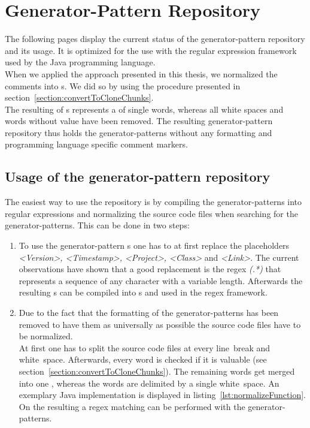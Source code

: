 
\chapter{Generator-Pattern Repository}\label{chapter:generatorPatternRepository}
The following pages display the current status of the generator-pattern repository and its usage. It is optimized for the use with the regular expression framework used by the Java programming language.\\
When we applied the approach presented in this thesis, we normalized the comments into s. We did so by using the procedure presented in section~\ref{section:convertToCloneChunks}.\\
The resulting  of s represents a  of single words, whereas all white spaces and words without value have been removed. The resulting generator-pattern repository thus holds the generator-patterns without any formatting and programming language specific comment markers.

\section{Usage of the generator-pattern repository}
The easiest way to use the repository is by compiling the generator-patterns into regular expressions and normalizing the source code files when searching for the generator-patterns. This can be done in two steps:

\begin{enumerate}
	\item To use the generator-pattern s one has to at first replace the placeholders \textit{<Version>, <Timestamp>, <Project>, <Class>} and \textit{<Link>}. The current observations have shown that a good replacement is the regex \textit{(.*)} that represents a sequence of any character with a variable length. Afterwards the resulting s can be compiled into s and used in the regex framework.
	\item Due to the fact that the formatting of the generator-patterns has been removed to have them as universally as possible the source code files have to be normalized. \\
	At first one has to split the source code files at every line~break and white~space. Afterwards, every word is checked if it is valuable (see section~\ref{section:convertToCloneChunks}). The remaining words get merged into one , whereas the words are delimited by a single white~space. An exemplary Java implementation is displayed in listing~\ref{lst:normalizeFunction}.\\
	On the resulting   a regex matching can be performed with the generator-patterns.
\end{enumerate}


